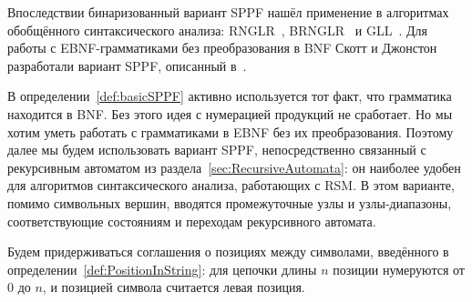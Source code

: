 Впоследствии бинаризованный вариант SPPF нашёл применение в алгоритмах обобщённого синтаксического анализа: RNGLR~, BRNGLR~ и GLL~.
Для работы с EBNF-грамматиками без преобразования в BNF Скотт и Джонстон разработали вариант SPPF, описанный в~.

В определении~\ref{def:basicSPPF} активно используется тот факт, что грамматика находится в BNF. Без этого идея с нумерацией продукций не сработает.
Но мы хотим уметь работать с грамматиками в EBNF без их преобразования. Поэтому далее мы будем использовать вариант SPPF, непосредственно связанный с рекурсивным автоматом из раздела~\ref{sec:RecursiveAutomata}: он наиболее удобен для алгоритмов синтаксического анализа, работающих с RSM.
В этом варианте, помимо символьных вершин, вводятся промежуточные узлы и узлы-диапазоны, соответствующие состояниям и переходам рекурсивного автомата.

Будем придерживаться соглашения о позициях между символами, введённого в определении~\ref{def:PositionInString}: для цепочки длины $n$ позиции нумеруются от $0$ до $n$, и позицией символа считается левая позиция.

